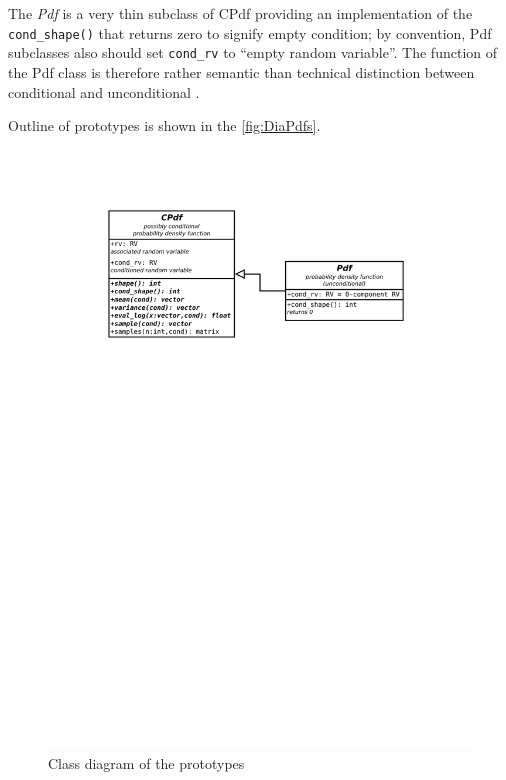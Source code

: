The \emph{Pdf} is a very thin subclass of CPdf providing an implementation of the \verb|cond_shape()|
that returns zero to signify empty condition; by convention, Pdf subclasses also should set
\verb|cond_rv| to ``empty random variable''. The function of the Pdf class is therefore rather
semantic than technical distinction between conditional and unconditional {\pdfs}.

Outline of {\pdf} prototypes is shown in the \autoref{fig:DiaPdfs}.

\begin{figure}[h]
	\centering
	\includegraphics[width=\textwidth,keepaspectratio=true,clip=true,trim=3cm 204mm 3cm 3cm]{./diagrams/pdfs.pdf}
	\vspace{-8mm}
	\caption{Class diagram of the {\pdf} prototypes}
	\label{fig:DiaPdfs}
\end{figure}

